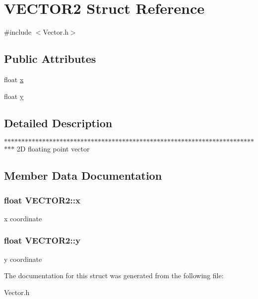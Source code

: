 \hypertarget{struct_v_e_c_t_o_r2}{
\section{VECTOR2 Struct Reference}
\label{struct_v_e_c_t_o_r2}
}


{\ttfamily \#include $<$Vector.h$>$}

\subsection*{Public Attributes}
\begin{DoxyCompactItemize}
\item 
float \hyperlink{struct_v_e_c_t_o_r2_ad08be7d2b6dfa23508b4f77589238267}{x}
\item 
float \hyperlink{struct_v_e_c_t_o_r2_ab41c005ab78d04217d61f6bcd58b77ea}{y}
\end{DoxyCompactItemize}


\subsection{Detailed Description}
$\ast$$\ast$$\ast$$\ast$$\ast$$\ast$$\ast$$\ast$$\ast$$\ast$$\ast$$\ast$$\ast$$\ast$$\ast$$\ast$$\ast$$\ast$$\ast$$\ast$$\ast$$\ast$$\ast$$\ast$$\ast$$\ast$$\ast$$\ast$$\ast$$\ast$$\ast$$\ast$$\ast$$\ast$$\ast$$\ast$$\ast$$\ast$$\ast$$\ast$$\ast$$\ast$$\ast$$\ast$$\ast$$\ast$$\ast$$\ast$$\ast$$\ast$$\ast$$\ast$$\ast$$\ast$$\ast$$\ast$$\ast$$\ast$$\ast$$\ast$$\ast$$\ast$$\ast$$\ast$$\ast$$\ast$$\ast$$\ast$$\ast$$\ast$$\ast$$\ast$$\ast$$\ast$$\ast$ 2D floating point vector 

\subsection{Member Data Documentation}
\hypertarget{struct_v_e_c_t_o_r2_ad08be7d2b6dfa23508b4f77589238267}{
\subsubsection[{x}]{\setlength{\rightskip}{0pt plus 5cm}float {\bf VECTOR2::x}}}
\label{struct_v_e_c_t_o_r2_ad08be7d2b6dfa23508b4f77589238267}
x coordinate \hypertarget{struct_v_e_c_t_o_r2_ab41c005ab78d04217d61f6bcd58b77ea}{
\subsubsection[{y}]{\setlength{\rightskip}{0pt plus 5cm}float {\bf VECTOR2::y}}}
\label{struct_v_e_c_t_o_r2_ab41c005ab78d04217d61f6bcd58b77ea}
y coordinate 

The documentation for this struct was generated from the following file:\begin{DoxyCompactItemize}
\item 
Vector.h\end{DoxyCompactItemize}
